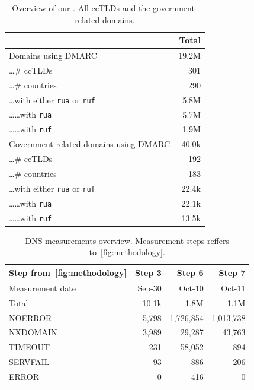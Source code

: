 \begin{table}[tb]
\scriptsize
\centering
\caption{Overview of our \dataset. All ccTLDs and the government-related domains.}
\begin{tabular}{lr}
\toprule
    & Total \\
\hline
Domains using DMARC & 19.2M \\
\ldots \# ccTLDs & 301 \\
\ldots \# countries & 290 \\
\ldots with either \texttt{rua} or \texttt{ruf} & 5.8M \\
\ldots \ldots with \texttt{rua} & 5.7M \\
\ldots \ldots with \texttt{ruf} & 1.9M \\
\hline
Government-related domains using DMARC & 40.0k\\
\ldots \# ccTLDs & 192 \\
\ldots \# countries & 183 \\
\ldots with either \texttt{rua} or \texttt{ruf} & 22.4k \\
\ldots \ldots with \texttt{rua} & 22.1k \\
\ldots \ldots with \texttt{ruf} & 13.5k \\
\bottomrule
\end{tabular}
\label{tab:data_overview}
\vspace{-10px}
\end{table}

\begin{table}[tb]
\scriptsize
\centering
\caption{DNS measurements overview. Measurement steps reffers to~\cref{fig:methodology}.}
\label{tab:dns_meas_overview}
\begin{tabular}{lrrr}
\toprule
\textbf{Step from~\cref{fig:methodology}} & \textbf{Step 3} & \textbf{Step 6} & \textbf{Step 7} \\
\midrule
Measurement date & Sep-30 & Oct-10 & Oct-11 \\
\midrule
Total & 10.1k & 1.8M & 1.1M \\
\midrule
NOERROR & 5,798 & 1,726,854 & 1,013,738 \\
NXDOMAIN & 3,989 & 29,287 & 43,763 \\
TIMEOUT & 231 & 58,052 & 894 \\
SERVFAIL & 93 & 886 & 206 \\
ERROR & 0 & 416 & 0 \\
\bottomrule
\end{tabular}
\vspace{-15px}
\end{table}